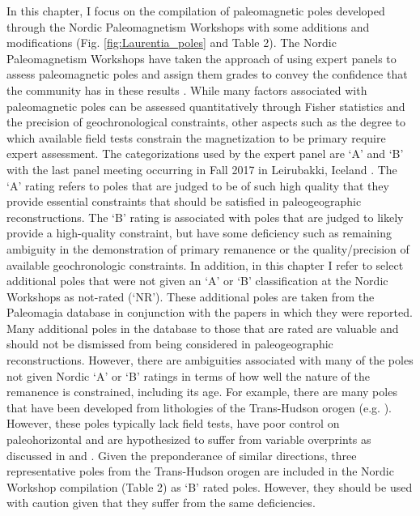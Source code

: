 \documentclass[twocolumn, switch]{article} %
\begin{document}
In this chapter, I focus on the compilation of paleomagnetic poles developed through the Nordic Paleomagnetism Workshops with some additions and modifications (Fig. \ref{fig:Laurentia_poles} and Table 2). The Nordic Paleomagnetism Workshops have taken the approach of using expert panels to assess paleomagnetic poles and assign them grades to convey the confidence that the community has in these results \citep{Evans2021a}. While many factors associated with paleomagnetic poles can be assessed quantitatively through Fisher statistics and the precision of geochronological constraints, other aspects such as the degree to which available field tests constrain the magnetization to be primary require expert assessment. The categorizations used by the expert panel are `A' and `B' with the last panel meeting occurring in Fall 2017 in Leirubakki, Iceland \citep{Brown2018a}. The `A' rating refers to poles that are judged to be of such high quality that they provide essential constraints that should be satisfied in paleogeographic reconstructions. The `B' rating is associated with poles that are judged to likely provide a high-quality constraint, but have some deficiency such as remaining ambiguity in the demonstration of primary remanence or the quality/precision of available geochronologic constraints. In addition, in this chapter I refer to select additional poles that were not given an `A' or `B' classification at the Nordic Workshops as not-rated (`NR'). These additional poles are taken from the Paleomagia database \citep{Veikkolainen2014a} in conjunction with the papers in which they were reported. Many additional poles in the database to those that are rated are valuable and should not be dismissed from being considered in paleogeographic reconstructions. However, there are ambiguities associated with many of the poles not given Nordic `A' or `B' ratings in terms of how well the nature of the remanence is constrained, including its age. For example, there are many poles that have been developed from lithologies of the Trans-Hudson orogen (e.g. \citealp{Symons2005a}). However, these poles typically lack field tests, have poor control on paleohorizontal and are hypothesized to suffer from variable overprints as discussed in \cite{Raub2008a} and \cite{DAgrella-Filho2020a}. Given the preponderance of similar directions, three representative poles from the Trans-Hudson orogen are included in the Nordic Workshop compilation (Table 2) as `B' rated poles. However, they should be used with caution given that they suffer from the same deficiencies. 
\end{document}
